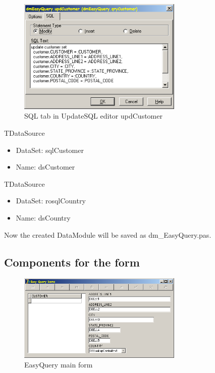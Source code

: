 \documentclass[a4paper,12pt,oneside]{book}
\begin{document}
\begin{figure}[htbp] 
  \centering
  \includegraphics[width=0.7\textwidth]{ZeosTutorial/dmEasyQuery_updCustomer_sql.png}
  \caption{SQL tab in UpdateSQL editor updCustomer}
  \label{fig:dmEasyQuery_updCustomer_sql}
\end{figure}
	
TDataSource
\begin{itemize}
  \item DataSet: sqlCustomer
  \item Name: dsCustomer
\end{itemize}

TDataSource
\begin{itemize}
  \item DataSet: rosqlCountry
	\item Name: dsCountry
\end{itemize}

Now the created DataModule will be saved as dm\_EasyQuery.pas.

\subsection{Components for the form}
\begin{figure}[htbp] 
  \centering
  \includegraphics[width=0.7\textwidth]{ZeosTutorial/frmEasyQuery.png}
  \caption{EasyQuery main form}
  \label{fig:frmEasyQuery}
\end{figure}
\end{document}
